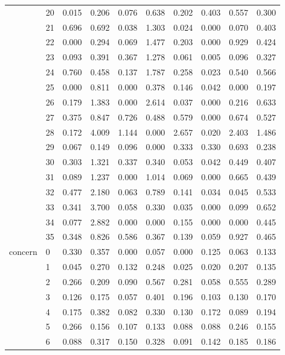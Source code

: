 \begin{table}
\begin{tabular}{llrrrrrrrr}
 & 20 & 0.015 & 0.206 & 0.076 & 0.638 & 0.202 & 0.403 & 0.557 & 0.300 \\
 & 21 & 0.696 & 0.692 & 0.038 & 1.303 & 0.024 & 0.000 & 0.070 & 0.403 \\
 & 22 & 0.000 & 0.294 & 0.069 & 1.477 & 0.203 & 0.000 & 0.929 & 0.424 \\
 & 23 & 0.093 & 0.391 & 0.367 & 1.278 & 0.061 & 0.005 & 0.096 & 0.327 \\
 & 24 & 0.760 & 0.458 & 0.137 & 1.787 & 0.258 & 0.023 & 0.540 & 0.566 \\
 & 25 & 0.000 & 0.811 & 0.000 & 0.378 & 0.146 & 0.042 & 0.000 & 0.197 \\
 & 26 & 0.179 & 1.383 & 0.000 & 2.614 & 0.037 & 0.000 & 0.216 & 0.633 \\
 & 27 & 0.375 & 0.847 & 0.726 & 0.488 & 0.579 & 0.000 & 0.674 & 0.527 \\
 & 28 & 0.172 & 4.009 & 1.144 & 0.000 & 2.657 & 0.020 & 2.403 & 1.486 \\
 & 29 & 0.067 & 0.149 & 0.096 & 0.000 & 0.333 & 0.330 & 0.693 & 0.238 \\
 & 30 & 0.303 & 1.321 & 0.337 & 0.340 & 0.053 & 0.042 & 0.449 & 0.407 \\
 & 31 & 0.089 & 1.237 & 0.000 & 1.014 & 0.069 & 0.000 & 0.665 & 0.439 \\
 & 32 & 0.477 & 2.180 & 0.063 & 0.789 & 0.141 & 0.034 & 0.045 & 0.533 \\
 & 33 & 0.341 & 3.700 & 0.058 & 0.330 & 0.035 & 0.000 & 0.099 & 0.652 \\
 & 34 & 0.077 & 2.882 & 0.000 & 0.000 & 0.155 & 0.000 & 0.000 & 0.445 \\
 & 35 & 0.348 & 0.826 & 0.586 & 0.367 & 0.139 & 0.059 & 0.927 & 0.465 \\
\cline{1-10}
\multirow[t]{13}{*}{concern} & 0 & 0.330 & 0.357 & 0.000 & 0.057 & 0.000 & 0.125 & 0.063 & 0.133 \\
 & 1 & 0.045 & 0.270 & 0.132 & 0.248 & 0.025 & 0.020 & 0.207 & 0.135 \\
 & 2 & 0.266 & 0.209 & 0.090 & 0.567 & 0.281 & 0.058 & 0.555 & 0.289 \\
 & 3 & 0.126 & 0.175 & 0.057 & 0.401 & 0.196 & 0.103 & 0.130 & 0.170 \\
 & 4 & 0.175 & 0.382 & 0.082 & 0.330 & 0.130 & 0.172 & 0.089 & 0.194 \\
 & 5 & 0.266 & 0.156 & 0.107 & 0.133 & 0.088 & 0.088 & 0.246 & 0.155 \\
 & 6 & 0.088 & 0.317 & 0.150 & 0.328 & 0.091 & 0.142 & 0.185 & 0.186 \\

\end{tabular}
\end{table}
